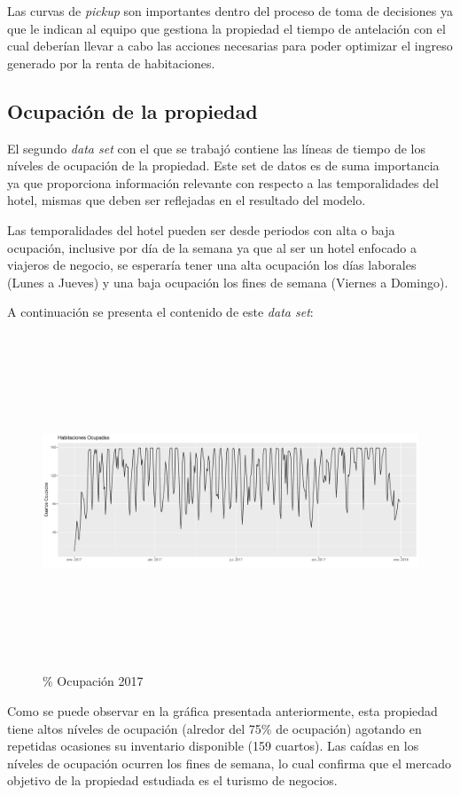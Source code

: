 Las curvas de \emph{pickup} son importantes dentro del proceso de toma de decisiones ya que le indican al equipo que gestiona la propiedad el tiempo de antelación con el cual deberían llevar a cabo las acciones necesarias para poder optimizar el ingreso generado por la renta de habitaciones.

\subsection*{Ocupación de la propiedad}

El segundo \emph{data set} con el que se trabajó contiene las líneas de tiempo de los níveles de ocupación de la propiedad. Este set de datos es de suma importancia ya que proporciona información relevante con respecto a las temporalidades del hotel, mismas que deben ser reflejadas en el resultado del modelo.

Las temporalidades del hotel pueden ser desde periodos con alta o baja ocupación, inclusive por día de la semana ya que al ser un hotel enfocado a viajeros de negocio, se esperaría tener una alta ocupación los días laborales (Lunes a Jueves) y una baja ocupación los fines de semana (Viernes a Domingo).

A continuación se presenta el contenido de este \emph{data set}:

\begin{figure}[H]
  \centering
      \includegraphics[width=\maxwidth,height=10cm]{figures/HabitacionesOcupadas-1}   
  \caption{\% Ocupación 2017}
\end{figure}


Como se puede observar en la gráfica presentada anteriormente, esta propiedad tiene altos níveles de ocupación (alredor del 75\% de ocupación) agotando en repetidas ocasiones su inventario disponible (159 cuartos). Las caídas en los níveles de ocupación ocurren los fines de semana, lo cual confirma que el mercado objetivo de la propiedad estudiada es el turismo de negocios.

